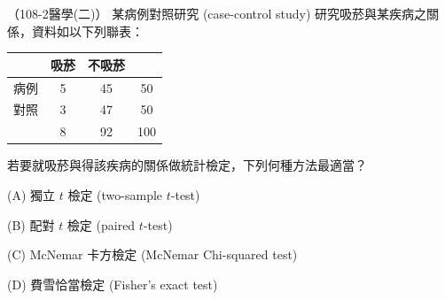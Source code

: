     \begin{docexam}{（108-2醫學(二)）}
        某病例對照研究 (case-control study) 研究吸菸與某疾病之關係，資料如以下列聯表：
        \begin{table}[htbp]
            \begin{center}
                \begin{tabular}{c|cc|c}
                    & 吸菸 & 不吸菸 & \\
                    \hline
                    病例 & 5 & 45 & 50\\
                    對照 & 3 & 47 & 50\\
                    \hline
                    & 8 & 92 & 100
                \end{tabular}
            \end{center}
        \end{table}
        
        \noindent 若要就吸菸與得該疾病的關係做統計檢定，下列何種方法最適當？
        
        (A) 獨立 $t$ 檢定 (two-sample $t$-test)
        
        (B) 配對 $t$ 檢定 (paired $t$-test)

        (C) McNemar 卡方檢定 (McNemar Chi-squared test)
 
        (D) 費雪恰當檢定 (Fisher's exact test)
    \end{docexam}